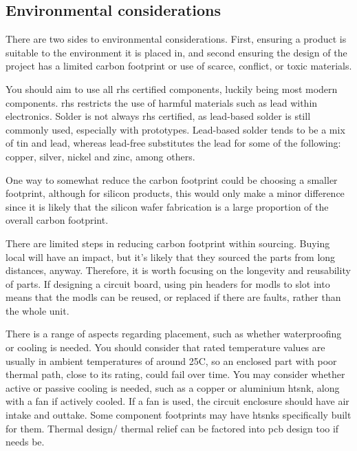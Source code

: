 \documentclass[a4paper,11pt]{report}
\begin{document}
\vspace*{1\baselineskip}

\subsection{Environmental considerations}
There are two sides to environmental considerations. First, ensuring a product is suitable to the environment it is placed in, and second ensuring the design of the project has a limited carbon footprint or use of scarce, conflict, or toxic materials.

You should aim to use all \gls{rhs} certified components, luckily being most modern components. \gls{rhs} restricts the use of harmful materials such as lead within electronics. Solder is not always \gls{rhs} certified, as lead-based solder is still commonly used, especially with prototypes. Lead-based solder tends to be a mix of tin and lead, whereas lead-free substitutes the lead for some of the following: copper, silver, nickel and zinc, among others.

One way to somewhat reduce the carbon footprint could be choosing a smaller footprint, although for silicon products, this would only make a minor difference since it is likely that the silicon wafer fabrication is a large proportion of the overall carbon footprint.

There are limited steps in reducing carbon footprint within sourcing. Buying local will have an impact, but it's likely that they sourced the parts from long distances, anyway. Therefore, it is worth focusing on the longevity and reusability of parts. If designing a circuit board, using pin headers for \gls{modl}s to slot into means that the \gls{modl}s can be reused, or replaced if there are faults, rather than the whole unit.

There is a range of aspects regarding placement, such as whether waterproofing or cooling is needed. You should consider that rated temperature values are usually in ambient temperatures of around 25\degree C, so an enclosed part with poor thermal path, close to its rating, could fail over time. You may consider whether active or passive cooling is needed, such as a copper or aluminium \gls{htsnk}, along with a fan if actively cooled. If a fan is used, the circuit enclosure should have air intake and outtake. Some component footprints may have \gls{htsnk}s specifically built for them. Thermal design/ thermal relief can be factored into \gls{pcb} design too if needs be.
\end{document}
